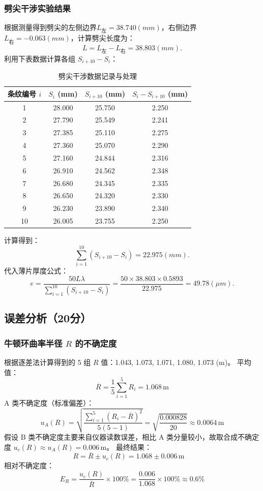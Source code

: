 \documentclass[]{../template/Report}%
\begin{document}
\begin{fullreportonly}
\subsubsection{劈尖干涉实验结果}
根据测量得到劈尖的左侧边界$L_{\text{左}}=38.740(mm)$，右侧边界$L_{\text{右}}=-0.063(mm)$，计算劈尖长度为：
\[L=L_{\text{左}}-L_{\text{右}}=38.803(mm).\]
利用下表数据计算各组 $S_{i+10} - S_i$：
\begin{table}[H]
  \centering
  \caption{劈尖干涉数据记录与处理}
  \begin{tabular}{cccc}
    \toprule
    条纹编号 $i$ & $S_i$ (mm) & $S_{i+10}$ (mm) & $S_{i}-S_{i+10}$ (mm) \\
    \midrule
    1 & 28.000 & 25.750 & 2.250 \\
    2 & 27.790 & 25.549 & 2.241 \\
    3 & 27.385 & 25.110 & 2.275 \\
    4 & 27.360 & 25.070 & 2.290 \\
    5 & 27.160 & 24.844 & 2.316 \\
    6 & 26.910 & 24.562 & 2.348 \\
    7 & 26.680 & 24.345 & 2.335 \\
    8 & 26.650 & 24.320 & 2.330 \\
    9 & 26.230 & 23.890 & 2.340 \\
    10 & 26.005 & 23.755 & 2.250 \\
    \bottomrule
  \end{tabular}
\end{table}
计算得到：
\[\sum_{i=1}^{10}(S_{i+10} - S_i) = 22.975(mm).\]
代入薄片厚度公式：
\[e = \frac{50L\lambda}{\sum_{i=1}^{10}(S_{i+10} - S_i)} = \frac{50 \times 38.803 \times 0.5893}{22.975} = 49.78 (\mu m).\]

\subsection{误差分析（20分）}

\subsubsection{牛顿环曲率半径 $R$ 的不确定度}
根据逐差法计算得到的 5 组 $R$ 值：1.043, 1.073, 1.071, 1.080, 1.073 (m)。
平均值：
\[ \overline{R} = \frac{1}{5}\sum_{i=1}^5 R_i = 1.068 \, \text{m} \]
A 类不确定度（标准偏差）：
\[ u_A(R) = \sqrt{\frac{\sum_{i=1}^5 (R_i - \overline{R})^2}{5(5-1)}} = \sqrt{\frac{0.000828}{20}} \approx 0.0064 \, \text{m} \]
假设 B 类不确定度主要来自仪器读数误差，相比 A 类分量较小，故取合成不确定度 $u_c(R) \approx u_A(R) = 0.006 \, \text{m}$。
最终结果：
\[ R = \overline{R} \pm u_c(R) = 1.068 \pm 0.006 \, \text{m} \quad \]
相对不确定度：
\[ E_R = \frac{u_c(R)}{\overline{R}} \times 100\% = \frac{0.006}{1.068} \times 100\% \approx 0.6\% \]


\end{fullreportonly}
\end{document}
